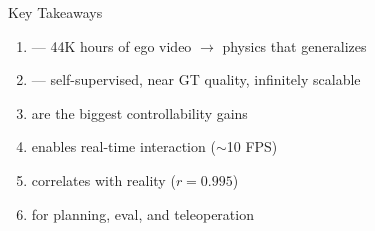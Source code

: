 \begin{frame}{Key Takeaways}
\begin{enumerate}
    \item {}
          --- 44K hours of ego video
          $\rightarrow$ physics that generalizes
    \item {}
          --- self-supervised, near GT quality,
          infinitely scalable
    \item {}
          are the biggest controllability gains
    \item {}
          enables real-time interaction ($\sim$10 FPS)
    \item {} correlates
          with reality ($r=0.995$)
    \item {}
          for planning, eval, and teleoperation
\end{enumerate}

\vspace{0.3em}
\begin{center}
\end{center}
\end{frame}

